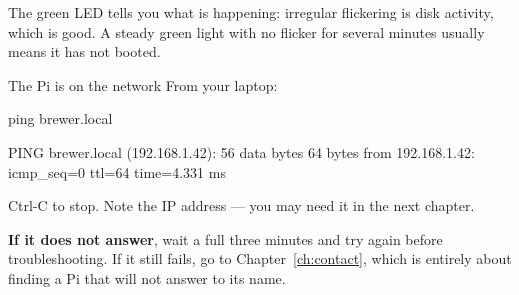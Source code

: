 The green LED tells you what is happening: irregular flickering is disk
activity, which is good. A steady green light with no flicker for several
minutes usually means it has not booted.

\begin{checkpoint}{The Pi is on the network}
From your laptop:

\begin{shell}
ping brewer.local
\end{shell}

\begin{trace}
PING brewer.local (192.168.1.42): 56 data bytes
64 bytes from 192.168.1.42: icmp_seq=0 ttl=64 time=4.331 ms
\end{trace}

Ctrl-C to stop. Note the IP address --- you may need it in the next chapter.

\textbf{If it does not answer}, wait a full three minutes and try again before
troubleshooting. If it still fails, go to Chapter~\ref{ch:contact}, which is
entirely about finding a Pi that will not answer to its name.
\end{checkpoint}
